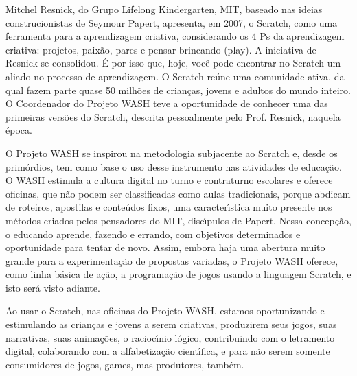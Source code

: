 \documentclass[
12pt,		%
openright,	%
twoside,  %
a4paper,			%
chapter=TITLE,		%
english,			%
french,				%
spanish,			%
brazil				%
]{USPSC-classe/USPSC_RedarTex}
\begin{document}
Mitchel Resnick, do Grupo Lifelong Kindergarten, MIT, baseado nas ideias construcionistas de Seymour Papert, apresenta, em 2007, o Scratch, como uma ferramenta para a aprendizagem criativa, considerando  os 4 Ps da aprendizagem criativa: projetos, paix\~ao, pares e pensar brincando (play). A  iniciativa de Resnick se consolidou. \'E por isso que, hoje, voc\^e pode encontrar no Scratch um aliado no processo de aprendizagem. O Scratch re\'une uma comunidade ativa, da qual fazem parte quase 50 milh\~oes de crian\c{c}as, jovens e adultos do mundo inteiro. O Coordenador do Projeto WASH teve a oportunidade de conhecer uma das primeiras vers\~oes do Scratch, descrita pessoalmente pelo Prof. Resnick, naquela \'epoca.










O Projeto WASH se inspirou na metodologia subjacente ao Scratch e, desde os prim\'ordios, tem como base o uso desse instrumento nas atividades de educa\c{c}\~ao. O WASH estimula a cultura digital no turno e contraturno escolares e oferece oficinas, que n\~ao podem ser classificadas como aulas tradicionais, porque abdicam de roteiros, apostilas e conte\'udos fixos, uma caracter\'{\i}stica muito presente nos m\'etodos criados pelos pensadores do MIT, disc\'{\i}pulos de Papert. Nessa concep\c{c}\~ao, o educando aprende, fazendo e errando, com objetivos determinados e oportunidade para tentar de novo. Assim, embora haja uma abertura muito grande para a experimenta\c{c}\~ao de propostas variadas, o Projeto WASH oferece, como linha b\'asica de a\c{c}\~ao, a programa\c{c}\~ao de jogos usando a linguagem Scratch, e isto ser\'a visto adiante.










Ao usar o Scratch, nas oficinas do Projeto WASH, estamos oportunizando e estimulando \textquotedbl as crian\c{c}as e jovens a serem criativas, produzirem seus jogos, suas narrativas, suas anima\c{c}\~oes, o racioc\'{\i}nio l\'ogico, contribuindo com o letramento digital, colaborando com a alfabetiza\c{c}\~ao cient\'{\i}fica, e para n\~ao serem somente consumidores de jogos, games, mas produtores, tamb\'em\textquotedbl .
\end{document}
